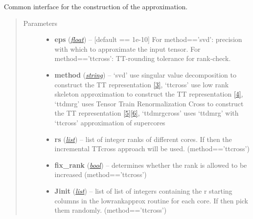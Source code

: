 \documentclass[a4paper,10pt,english]{sphinxmanual}
\begin{document}
\begin{fulllineitems}
\begin{fulllineitems}
\label{api-qttmat:TensorToolbox.core.QTTmat.build}
Common interface for the construction of the approximation.
\begin{quote}\begin{description}
\item[{Parameters}] \leavevmode\begin{itemize}
\item {} 
\textbf{eps} (\href{http://docs.python.org/library/functions.html\#float}{\emph{float}}) -- {[}default == 1e-10{]} For method=='svd': precision with which to approximate the input tensor. For method=='ttcross': TT-rounding tolerance for rank-check.

\item {} 
\textbf{method} (\href{http://docs.python.org/library/string.html\#module-string}{\emph{string}}) -- `svd' use singular value decomposition to construct the TT representation {\hyperref[zrefs:oseledets2011]{{[}3{]}}}, `ttcross' use low rank skeleton approximation to construct the TT representation {\hyperref[zrefs:oseledets2010]{{[}4{]}}}, `ttdmrg' uses Tensor Train Renormalization Cross to construct the TT representation {\hyperref[zrefs:savostyanov2011]{{[}5{]}}}{\hyperref[zrefs:savostyanov2013]{{[}6{]}}}, `ttdmrgcross' uses `ttdmrg' with `ttcross' approximation of supercores

\item {} 
\textbf{rs} (\href{http://docs.python.org/library/functions.html\#list}{\emph{list}}) -- list of integer ranks of different cores. If  then the incremental TTcross approach will be used. (method=='ttcross')

\item {} 
\textbf{fix\_rank} (\href{http://docs.python.org/library/functions.html\#bool}{\emph{bool}}) -- determines whether the rank is allowed to be increased (method=='ttcross')

\item {} 
\textbf{Jinit} (\href{http://docs.python.org/library/functions.html\#list}{\emph{list}}) -- list of list of integers containing the r starting columns in the lowrankapprox routine for each core. If  then pick them randomly. (method=='ttcross')


\end{itemize}
\end{description}
\end{quote}
\end{fulllineitems}
\end{fulllineitems}
\end{document}
